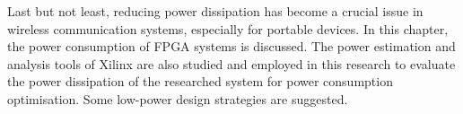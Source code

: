 Last but not least, reducing power dissipation has become a crucial issue in wireless communication systems, especially for portable devices.
In this chapter, the power consumption of FPGA systems is discussed.
The power estimation and analysis tools of Xilinx are also studied and employed in this research to evaluate the power dissipation of the researched system for power consumption optimisation.
Some low-power design strategies are suggested.

